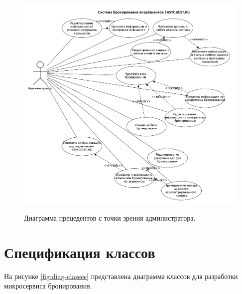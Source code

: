 \begin{figure}[h!]
	\begin{center}
		{\includegraphics[scale = 0.54]{img/use-case/admin.png}}
		\caption{Диаграмма прецедентов с точки зрения администратора.}
		\label{fig:use-case-admin}
	\end{center}
\end{figure}

\pagebreak

\section*{Спецификация классов}
На рисунке \ref{fig:diag-classes} представлена диаграмма классов для разработки микросервиса бронирования.

